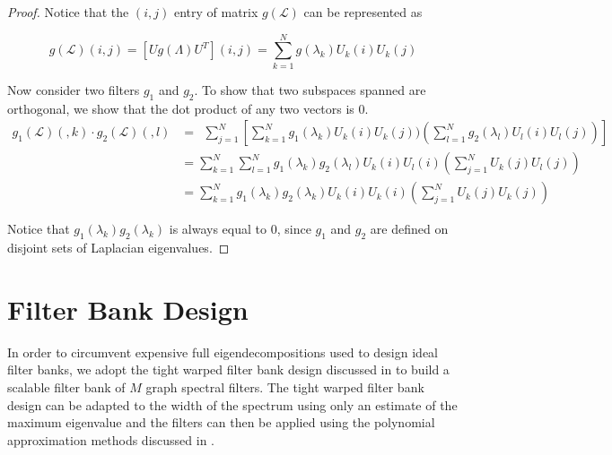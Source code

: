 \documentclass[a4paper]{article}
\newcommand{\La}{\mathcal{L}}
\theoremstyle{definition}
\begin{document}
\begin{proof}


Notice that the $(i,j)$ entry of matrix $g(\La)$ can be represented as 

$$g(\La) (i,j) = [Ug(\Lambda)U^T] (i,j) = \sum_{k = 1}^{N} g(\lambda_k) U_k(i) U_k(j)$$

Now consider two filters $g_1$ and $g_2$. To show that two subspaces spanned are orthogonal, we show that the dot product of any two vectors is 0.
\begin{align*}
g_1(\La)(,k) \cdot g_2(\La)(,l)&=\ \  \sum_{j = 1}^{N} [\sum_{k = 1}^{N} g_1(\lambda_k) U_k(i) U_k(j) )( \sum_{l = 1}^{N} g_2(\lambda_l) U_l(i) U_l(j)) ] \\
& = \sum_{k = 1}^{N} \sum_{l = 1}^{N} g_1(\lambda_k) g_2(\lambda_l)  U_k(i) U_l(i) ( \sum_{j = 1}^{N}  U_k(j)  U_l(j))  \\
& = \sum_{k = 1}^{N} g_1(\lambda_k) g_2(\lambda_k)  U_k(i) U_k(i) ( \sum_{j = 1}^{N}  U_k(j)  U_k(j)) 
\end{align*}

Notice that $g_1(\lambda_k) g_2(\lambda_k)$ is always equal to $0$, since $g_1$ and $g_2$ are defined on disjoint sets of Laplacian eigenvalues.   

\end{proof}








\newpage

\section{Filter Bank Design}




In order to circumvent expensive full eigendecompositions used to design ideal filter banks, we adopt the tight warped filter bank design discussed in \cite{shuman2013spectrum} to build a scalable filter bank of $M$ graph spectral filters. The tight warped filter bank design can be adapted to the width of the spectrum using only an estimate of the maximum eigenvalue and the filters can then be applied using the polynomial approximation methods discussed in \cite{hammond2011wavelets, shuman_DCOSS_2011}.
\end{document}
